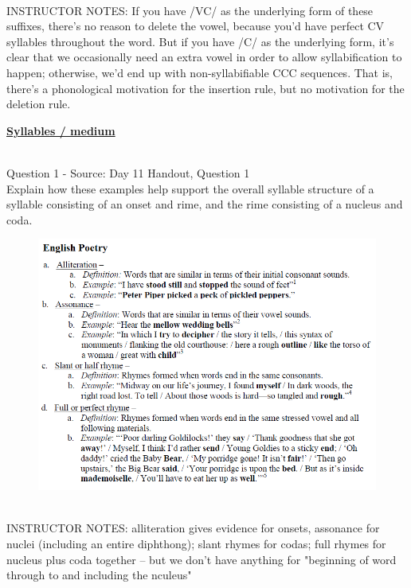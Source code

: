 \documentclass[12pt]{article}
\begin{document}
~\\
INSTRUCTOR NOTES: If you have /VC/ as the underlying form of these suffixes, there’s no reason to delete the vowel, because you'd have perfect CV syllables throughout the word. But if you have /C/ as the underlying form, it’s clear that we occasionally need an extra vowel in order to allow syllabification to happen; otherwise, we’d end up with non-syllabifiable CCC sequences. That is, there’s a phonological motivation for the insertion rule, but no motivation for the deletion rule.


\newpage\textbf{\underline{\huge Syllables / medium\\}}

~\\

{\large Question 1} - Source: Day 11 Handout, Question 1\\

Explain how these examples help support the overall syllable structure of a syllable consisting of an onset and rime, and the rime consisting of a nucleus and coda.\\

\begin{figure}[H]
\includegraphics{../images/english_poetry.png}
\end{figure}

~\\
INSTRUCTOR NOTES: alliteration gives evidence for onsets, assonance for nuclei (including an entire diphthong); slant rhymes for codas; full rhymes for nucleus plus coda together -- but we don't have anything for "beginning of word through to and including the nculeus"
\end{document}
